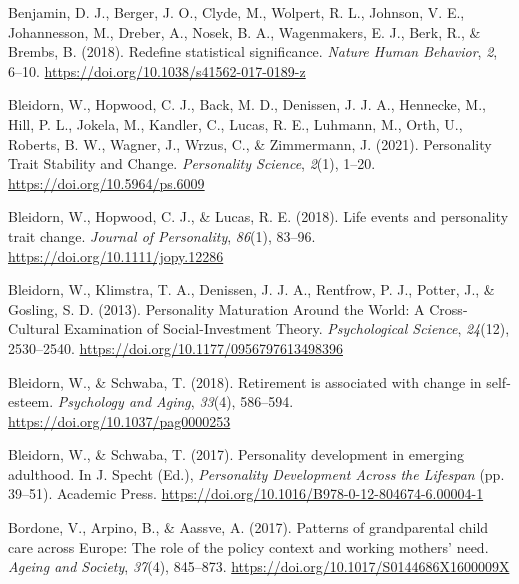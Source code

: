 \documentclass[
  english,
  man, noextraspace]{apa7}
\begin{document}
\leavevmode\hypertarget{ref-benjaminRedefineStatisticalSignificance2018}{}%
Benjamin, D. J., Berger, J. O., Clyde, M., Wolpert, R. L., Johnson, V. E., Johannesson, M., Dreber, A., Nosek, B. A., Wagenmakers, E. J., Berk, R., \& Brembs, B. (2018). Redefine statistical significance. \emph{Nature Human Behavior}, \emph{2}, 6--10. \url{https://doi.org/10.1038/s41562-017-0189-z}

\leavevmode\hypertarget{ref-bleidornPersonalityTraitStability2021}{}%
Bleidorn, W., Hopwood, C. J., Back, M. D., Denissen, J. J. A., Hennecke, M., Hill, P. L., Jokela, M., Kandler, C., Lucas, R. E., Luhmann, M., Orth, U., Roberts, B. W., Wagner, J., Wrzus, C., \& Zimmermann, J. (2021). Personality Trait Stability and Change. \emph{Personality Science}, \emph{2}(1), 1--20. \url{https://doi.org/10.5964/ps.6009}

\leavevmode\hypertarget{ref-bleidornLifeEventsPersonality2018}{}%
Bleidorn, W., Hopwood, C. J., \& Lucas, R. E. (2018). Life events and personality trait change. \emph{Journal of Personality}, \emph{86}(1), 83--96. \url{https://doi.org/10.1111/jopy.12286}

\leavevmode\hypertarget{ref-bleidornPersonalityMaturationWorld2013}{}%
Bleidorn, W., Klimstra, T. A., Denissen, J. J. A., Rentfrow, P. J., Potter, J., \& Gosling, S. D. (2013). Personality Maturation Around the World: A Cross-Cultural Examination of Social-Investment Theory. \emph{Psychological Science}, \emph{24}(12), 2530--2540. \url{https://doi.org/10.1177/0956797613498396}

\leavevmode\hypertarget{ref-bleidornRetirementAssociatedChange2018}{}%
Bleidorn, W., \& Schwaba, T. (2018). Retirement is associated with change in self-esteem. \emph{Psychology and Aging}, \emph{33}(4), 586--594. \url{https://doi.org/10.1037/pag0000253}

\leavevmode\hypertarget{ref-bleidornPersonalityDevelopmentEmerging2017}{}%
Bleidorn, W., \& Schwaba, T. (2017). Personality development in emerging adulthood. In J. Specht (Ed.), \emph{Personality Development Across the Lifespan} (pp. 39--51). Academic Press. \url{https://doi.org/10.1016/B978-0-12-804674-6.00004-1}

\leavevmode\hypertarget{ref-bordonePatternsGrandparentalChild2017}{}%
Bordone, V., Arpino, B., \& Aassve, A. (2017). Patterns of grandparental child care across Europe: The role of the policy context and working mothers' need. \emph{Ageing and Society}, \emph{37}(4), 845--873. \url{https://doi.org/10.1017/S0144686X1600009X}
\end{document}
